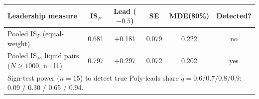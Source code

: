 \begin{tabular}{lccccc}
\toprule
Leadership measure & IS$_P$ & Lead ($-0.5$) & SE & MDE(80\%) & Detected? \\
\midrule
Pooled IS$_{P}$ (equal-weight) & 0.681 & +0.181 & 0.079 & 0.222 & no \\
Pooled IS$_{P}$, liquid pairs ($N\ge1000$, n=11) & 0.797 & +0.297 & 0.072 & 0.202 & yes \\
\midrule
\multicolumn{6}{l}{\footnotesize Sign-test power ($n=15$) to detect true Poly-leads share
$q=0.6/0.7/0.8/0.9$: 0.09 / 0.30 / 0.65 / 0.94.} \\
\bottomrule
\end{tabular}